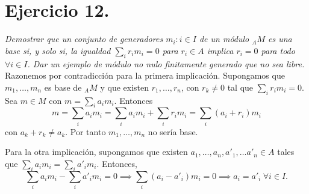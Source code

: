\section{Ejercicio 12.}%
\label{sec:ejercicio_12_}

\textit{Demostrar que un conjunto de generadores $m_i: i \in I$ de un módulo  ${}_AM$ es una base si, y solo si, la igualdad $\sum_i r_im_i = 0$ para $r_i \in A$ implica $r_i = 0$ para todo $\forall i \in I$. Dar un ejemplo de módulo no nulo finitamente generado que no sea libre.}\\

Razonemos por contradicción para la primera implicación. Supongamos que $m_1, \dots, m_n$ es base de ${}_AM$ y que existen $r_1, \dots, r_n$, con $r_k \neq 0$ tal que $\sum_ir_im_i = 0$. Sea $m \in M$ con $m = \sum_ia_im_i$. Entonces
\[
m = \sum_ia_im_i = \sum_ia_im_i + \sum_ir_im_i = \sum_i(a_i+r_i)m_i
\]
con $a_k + r_k \neq a_k$. Por tanto $m_1, \dots, m_n$ no sería base.

Para la otra implicación, supongamos que existen $ a_1, \dots, a_n, a'_1, \dots a'_n \in A$ tales que $\sum_i a_im_i= \sum_i a'_im_i$. Entonces,
\[
\sum_i a_im_i - \sum_i a'_im_i = 0 \implies \sum_i (a_i - a'_i)m_i = 0 \implies a_i = a'_i\ \forall i \in I
.\]
